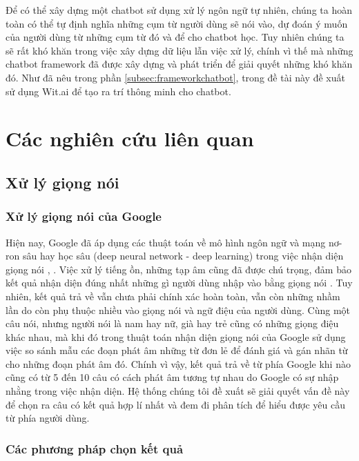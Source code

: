 \documentclass[12pt]{report}
\begin{document}
Để có thể xây dựng một chatbot sử dụng xử lý ngôn ngữ tự nhiên, chúng ta hoàn toàn có thể tự định nghĩa những cụm từ người dùng sẽ nói vào, dự đoán ý muốn của người dùng từ những cụm từ đó và để cho chatbot học. Tuy nhiên chúng ta sẽ rất khó khăn trong việc xây dựng dữ liệu lẫn việc xử lý, chính vì thế mà những chatbot framework đã được xây dựng và phát triển để giải quyết những khó khăn đó. Như đã nêu trong phần \ref{subsec:frameworkchatbot}, trong đề tài này đề xuất sử dụng Wit.ai để tạo ra trí thông minh cho chatbot.

\chapter{Các nghiên cứu liên quan}

\section{Xử lý giọng nói}

\subsection{Xử lý giọng nói của Google}

Hiện nay, Google đã áp dụng các thuật toán về mô hình ngôn ngữ và mạng nơ-ron sâu hay học sâu (deep neural network - deep learning) trong việc nhận diện giọng nói \cite{robustasr}, \cite{bayesLMformobile}. Việc xử lý tiếng ồn, những tạp âm cũng đã được chú trọng, đảm bảo kết quả nhận diện đúng nhất những gì người dùng nhập vào bằng giọng nói \cite{robustasr}. Tuy nhiên, kết quả trả về vẫn chưa phải chính xác hoàn toàn, vẫn còn những nhầm lần do còn phụ thuộc nhiều vào giọng nói và ngữ điệu của người dùng. Cùng một câu nói, nhưng người nói là nam hay nữ, già hay trẻ cũng có những giọng điệu khác nhau, mà khi đó trong thuật toán nhận diện giọng nói của Google sử dụng việc so sánh mẫu các đoạn phát âm những từ đơn lẻ để đánh giá và gán nhãn từ cho những đoạn phát âm đó. Chính vì vậy, kết quả trả về từ phía Google khi nào cũng có từ 5 đến 10 câu có cách phát âm tương tự nhau do Google có sự nhập nhằng trong việc nhận diện. Hệ thống chúng tôi đề xuất sẽ giải quyết vấn đề này để chọn ra câu có kết quả hợp lí nhất và đem đi phân tích để hiểu được yêu cầu từ phía người dùng.

\subsection{Các phương pháp chọn kết quả}
\end{document}
